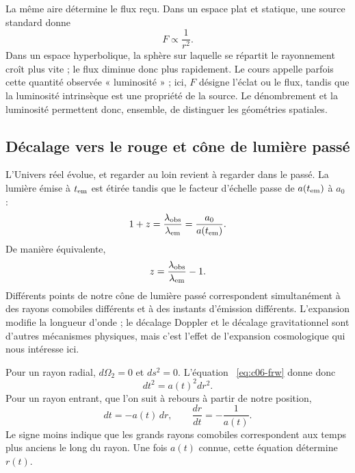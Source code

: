 La même aire détermine le flux reçu. Dans un espace plat et statique, une source standard donne
\begin{equation}
F\propto\frac{1}{r^2}.
\end{equation}
Dans un espace hyperbolique, la sphère sur laquelle se répartit le rayonnement croît plus vite ; le flux diminue donc plus rapidement. Le cours appelle parfois cette quantité observée « luminosité » ; ici, \(F\) désigne l’éclat ou le flux, tandis que la luminosité intrinsèque est une propriété de la source. Le dénombrement et la luminosité permettent donc, ensemble, de distinguer les géométries spatiales.

\subsection{Décalage vers le rouge et cône de lumière passé}

L’Univers réel évolue, et regarder au loin revient à regarder dans le passé. La lumière émise à \(t_{\rm em}\) est étirée tandis que le facteur d’échelle passe de \(a(t_{\rm em})\) à \(a_0\) :
\begin{equation}
1+z
=\frac{\lambda_{\rm obs}}{\lambda_{\rm em}}
=\frac{a_0}{a(t_{\rm em})}.
\label{eq:c06-redshift}
\end{equation}
De manière équivalente,
\begin{equation}
z=\frac{\lambda_{\rm obs}}{\lambda_{\rm em}}-1.
\end{equation}
Différents points de notre cône de lumière passé correspondent simultanément à des rayons comobiles différents et à des instants d’émission différents. L’expansion modifie la longueur d’onde ; le décalage Doppler et le décalage gravitationnel sont d’autres mécanismes physiques, mais c’est l’effet de l’expansion cosmologique qui nous intéresse ici.

\begin{classroomqa}
\end{classroomqa}

Pour un rayon radial, \(d\Omega_2=0\) et \(ds^2=0\). L’équation ~\eqref{eq:c06-frw} donne donc
\begin{equation}
dt^2=a(t)^2dr^2.
\end{equation}
Pour un rayon entrant, que l’on suit à rebours à partir de notre position,
\begin{equation}
dt=-a(t)\,dr,
\qquad
\frac{dr}{dt}=-\frac{1}{a(t)}.
\label{eq:c06-null-ray}
\end{equation}
Le signe moins indique que les grands rayons comobiles correspondent aux temps plus anciens le long du rayon. Une fois \(a(t)\) connue, cette équation détermine \(r(t)\).

